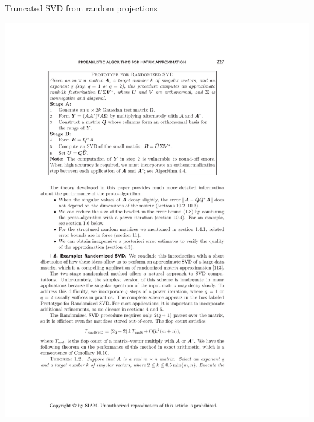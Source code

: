 
\begin{frame}[fragile]
\fontsize{8pt}{10}\selectfont
\begin{block}{Truncated SVD from random projections\footnotemark}
  \begin{minipage}{.56\textwidth}
    \begin{center}
      \includegraphics[height=.41\textheight]{../common/pics/randsvd/randSVDalg}
      \\

\end{center}
\end{minipage}
\end{block}
\end{frame}
